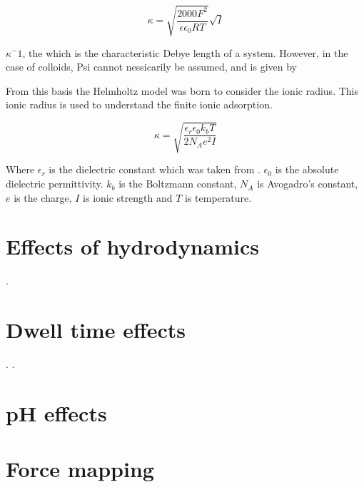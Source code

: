 \begin{equation} 
\kappa =  \sqrt{\frac{2000 F^2}{\epsilon \epsilon_0 R T}} \sqrt{I}
\end{equation}

$\kappa^-1$, the which is the characteristic Debye length of a system. However, in the case of colloids, Psi cannot nessicarily be assumed, and is given by  %

 From this basis the Helmholtz model was born to consider the ionic radius. This ionic radius is used to understand the finite ionic adsorption. %
 
\begin{equation}
\kappa = \sqrt{\frac{\epsilon_r \epsilon_0 k_b T}{2 N_A e^2 I}}
\end{equation}

Where $\epsilon_r$ is the dielectric constant which was taken from \cite{WaterGlycerolEpR}. $\epsilon_0$ is the absolute dielectric permittivity. $k_b$ is the Boltzmann constant, $N_A$ is Avogadro's constant,  $e$ is the charge, $I$ is ionic strength and $T$ is temperature.

\section{Effects of hydrodynamics}

\newpage.
\newpage

\section{Dwell time effects}

\newpage.
\newpage.
\newpage

\section{pH effects}

\newpage
\newpage

\section{Force mapping}


